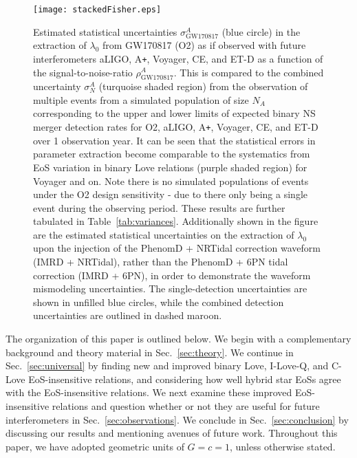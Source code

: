 \documentclass[prd,twocolumn,nofootinbib,superscriptaddress,amsmath,amssymb]{revtex4-1}
\begin{document}
\begin{figure}
\begin{center} 
\texttt{[image: stackedFisher.eps]}
\end{center}
\caption{
Estimated statistical uncertainties $\sigma^A_{\text{GW170817}}$ (blue circle) in the extraction of $\lambda_0$ from GW170817 (O2) as if observed with future interferometers aLIGO, A\texttt{+}, Voyager, CE, and ET-D as a function of the signal-to-noise-ratio $\rho^A_{\text{GW170817}}$.
This is compared to the combined uncertainty $\sigma^A_N$ (turquoise shaded region) from the observation of multiple events from a simulated population of size $N_A$ corresponding to the upper and lower limits of expected binary NS merger detection rates for O2, aLIGO, A\texttt{+}, Voyager, CE, and ET-D over 1 observation year.
It can be seen that the statistical errors in parameter extraction become comparable to the systematics from EoS variation in binary Love relations (purple shaded region) for Voyager and on.
Note there is no simulated populations of events under the O2 design sensitivity - due to there only being a single event during the observing period.
These results are further tabulated in Table~\ref{tab:variances}.
Additionally shown in the figure are the estimated statistical uncertainties on the extraction of $\lambda_0$ upon the injection of the PhenomD + NRTidal correction waveform (IMRD + NRTidal), rather than the PhenomD + 6PN tidal correction (IMRD + 6PN), in order to demonstrate the waveform mismodeling uncertainties.
The single-detection uncertainties are shown in unfilled blue circles, while the combined detection uncertainties are outlined in dashed maroon.
}
\label{fig:stackedFisher}
\end{figure} 

The organization of this paper is outlined below.
We begin with a complementary background and theory material in Sec.~\ref{sec:theory}.
We continue in Sec.~\ref{sec:universal} by finding new and improved binary Love, I-Love-Q, and C-Love EoS-insensitive relations, and considering how well hybrid star EoSs agree with the EoS-insensitive relations.
We next examine these improved EoS-insensitive relations and question whether or not they are useful for future interferometers in Sec.~\ref{sec:observations}.
We conclude in Sec.~\ref{sec:conclusion} by discussing our results and mentioning avenues of future work.
Throughout this paper, we have adopted geometric units of $G=c=1$, unless otherwise stated.

\end{document}
